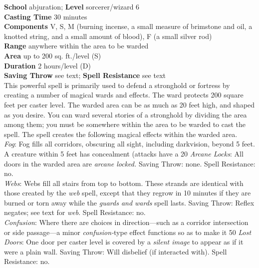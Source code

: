\textbf{School} abjuration; \textbf{Level} sorcerer/wizard 6\\
\textbf{Casting Time} 30 minutes\\
\textbf{Components} V, S, M (burning incense, a small measure of brimstone and oil, a knotted string, and a small amount of blood), F (a small silver rod)\\
\textbf{Range} anywhere within the area to be warded\\
\textbf{Area} up to 200 sq. ft./level (S)\\
\textbf{Duration} 2 hours/level (D)\\
\textbf{Saving Throw} see text; \textbf{Spell Resistance} see text\\
This powerful spell is primarily used to defend a stronghold or fortress by creating a number of magical wards and effects. The ward protects 200 square feet per caster level. The warded area can be as much as 20 feet high, and shaped as you desire. You can ward several stories of a stronghold by dividing the area among them; you must be somewhere within the area to be warded to cast the spell. The spell creates the following magical effects within the warded area.\\
\textit{Fog}: Fog fills all corridors, obscuring all sight, including darkvision, beyond 5 feet. A creature within 5 feet has concealment (attacks have a 20%
\textit{Arcane Locks}: All doors in the warded area are \textit{arcane locked. }Saving Throw: none. Spell Resistance: no.\\
\textit{Webs}: Webs fill all stairs from top to bottom. These strands are identical with those created by the \textit{web }spell, except that they regrow in 10 minutes if they are burned or torn away while the \textit{guards and wards }spell lasts. Saving Throw: Reflex negates; see text for \textit{web}. Spell Resistance: no.\\
\textit{Confusion}: Where there are choices in direction---such as a corridor intersection or side passage---a minor \textit{confusion-}type effect functions so as to make it 50%
\textit{Lost Doors}: One door per caster level is covered by a \textit{silent image }to appear as if it were a plain wall. Saving Throw: Will disbelief (if interacted with). Spell Resistance: no.\\
